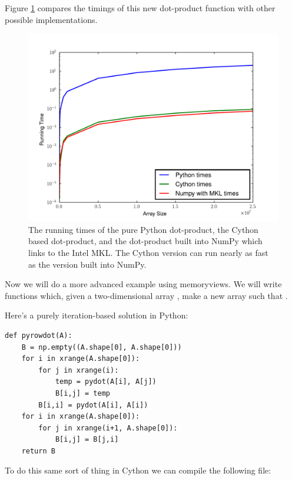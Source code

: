 Figure \ref{cython:dot} compares the timings of this new dot-product function with other possible implementations.

\begin{figure}
\centering
\includegraphics[width=\textwidth]{dot.pdf}
\caption{The running times of the pure Python dot-product, the Cython based dot-product, and the dot-product built into NumPy which links to the Intel MKL.
The Cython version can run nearly as fast as the version built into NumPy.}
\label{cython:dot}
\end{figure}

Now we will do a more advanced example using memoryviews.
We will write functions which, given a two-dimensional array , make a new array  such that
.

Here's a purely iteration-based solution in Python:
\begin{lstlisting}
def pyrowdot(A):
    B = np.empty((A.shape[0], A.shape[0]))
    for i in xrange(A.shape[0]):
        for j in xrange(i):
            temp = pydot(A[i], A[j])
            B[i,j] = temp
        B[i,i] = pydot(A[i], A[i])
    for i in xrange(A.shape[0]):
        for j in xrange(i+1, A.shape[0]):
            B[i,j] = B[j,i]
    return B
\end{lstlisting}

To do this same sort of thing in Cython we can compile the following file:

